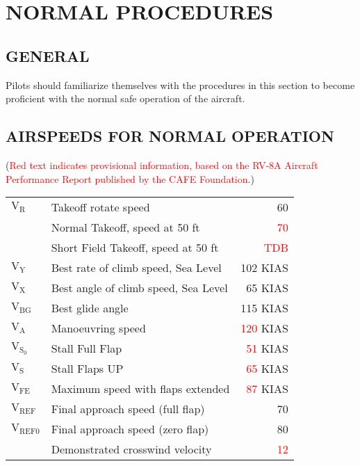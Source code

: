 \chapter{NORMAL PROCEDURES}
\vspace{\minitocspacebefore}
\minitoc
\cleardoublepage

\section{GENERAL}

Pilots should familiarize themselves with the procedures in this section
to become proficient with the normal safe operation of the aircraft.

\section{AIRSPEEDS FOR NORMAL OPERATION}
(\textcolor{red}{Red text indicates provisional information, based
on the RV-8A Aircraft Performance Report published by the CAFE Foundation}.)

\begin{center}\begin{tabular}{llr}
$\mathrm{V_{R}}$&
Takeoff rotate speed&
60\tabularnewline
&
Normal Takeoff, speed at 50 ft &
\textcolor{red}{70}\tabularnewline
&
Short Field Takeoff, speed at 50 ft&
\textcolor{red}{TDB}\tabularnewline
$\mathrm{V_{Y}}$ &
Best rate of climb speed, Sea Level&
102 KIAS\tabularnewline
$\mathrm{V_{X}}$ &
Best angle of climb speed, Sea Level&
65 KIAS\tabularnewline
$\mathrm{V_{BG}}$&
Best glide angle&
115 KIAS\tabularnewline
$\mathrm{V_{A}}$ &
Manoeuvring speed&
\textcolor{red}{120} KIAS\tabularnewline
$\mathrm{V_{S_{0}}}$ &
Stall Full Flap&
\textcolor{red}{51} KIAS\tabularnewline
$\mathrm{V_{S}}$ &
Stall Flaps UP&
\textcolor{red}{65} KIAS\tabularnewline
$\mathrm{V_{FE}}$ &
Maximum speed with flaps extended &
\textcolor{red}{87} KIAS\tabularnewline
$\mathrm{V_{REF}}$ &
Final approach speed (full flap)&
70\tabularnewline
$\mathrm{V_{REF0}}$ &
Final approach speed (zero flap)&
80\tabularnewline
&
Demonstrated crosswind velocity&
\textcolor{red}{12}\tabularnewline
\end{tabular}\end{center}

%

